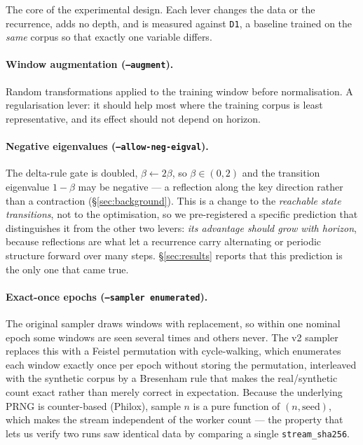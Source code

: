 The core of the experimental design. Each lever changes the data or the
recurrence, adds no depth, and is measured against \texttt{D1}, a baseline
trained on the \emph{same} corpus so that exactly one variable differs.

\paragraph{Window augmentation (\texttt{--augment}).} Random transformations
applied to the training window before normalisation. A regularisation lever:
it should help most where the training corpus is least representative, and its
effect should not depend on horizon.

\paragraph{Negative eigenvalues (\texttt{--allow-neg-eigval}).} The delta-rule
gate is doubled, $\beta \leftarrow 2\beta$, so $\beta \in (0,2)$ and the
transition eigenvalue $1-\beta$ may be negative --- a reflection along the key
direction rather than a contraction (\S\ref{sec:background}). This is a change
to the \emph{reachable state transitions}, not to the optimisation, so we
pre-registered a specific prediction that distinguishes it from the other two
levers: \emph{its advantage should grow with horizon}, because reflections are
what let a recurrence carry alternating or periodic structure forward over many
steps. \S\ref{sec:results} reports that this prediction is the only one that
came true.

\paragraph{Exact-once epochs (\texttt{--sampler enumerated}).} The original
sampler draws windows with replacement, so within one nominal epoch some
windows are seen several times and others never. The v2 sampler replaces this
with a Feistel permutation with cycle-walking, which enumerates each window
exactly once per epoch without storing the permutation, interleaved with the
synthetic corpus by a Bresenham rule that makes the real/synthetic count exact
rather than merely correct in expectation. Because the underlying PRNG is
counter-based (Philox), sample $n$ is a pure function of $(n, \text{seed})$,
which makes the stream independent of the worker count --- the property that
lets us verify two runs saw identical data by comparing a single
\texttt{stream\_sha256}.

